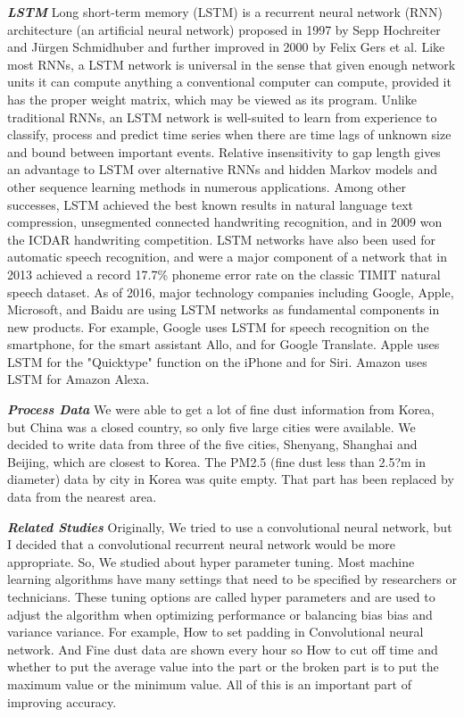 \documentclass{kcc}
\begin{document}
\textbf{\textit{LSTM}}
Long short-term memory (LSTM) is a recurrent neural network (RNN) architecture (an artificial neural network) proposed in 1997 by Sepp Hochreiter and Jürgen Schmidhuber and further improved in 2000 by Felix Gers et al. Like most RNNs, a LSTM network is universal in the sense that given enough network units it can compute anything a conventional computer can compute, provided it has the proper weight matrix, which may be viewed as its program. Unlike traditional RNNs, an LSTM network is well-suited to learn from experience to classify, process and predict time series when there are time lags of unknown size and bound between important events. Relative insensitivity to gap length gives an advantage to LSTM over alternative RNNs and hidden Markov models and other sequence learning methods in numerous applications. Among other successes, LSTM achieved the best known results in natural language text compression, unsegmented connected handwriting recognition, and in 2009 won the ICDAR handwriting competition. LSTM networks have also been used for automatic speech recognition, and were a major component of a network that in 2013 achieved a record 17.7\% phoneme error rate on the classic TIMIT natural speech dataset. As of 2016, major technology companies including Google, Apple, Microsoft, and Baidu are using LSTM networks as fundamental components in new products. For example, Google uses LSTM for speech recognition on the smartphone, for the smart assistant Allo, and for Google Translate. Apple uses LSTM for the "Quicktype" function on the iPhone and for Siri. Amazon uses LSTM for Amazon Alexa.

\textbf{\textit{Process Data}}
We were able to get a lot of fine dust information from Korea, but China was a closed country, so only five large cities were available. We decided to write data from three of the five cities, Shenyang, Shanghai and Beijing, which are closest to Korea. The PM2.5 (fine dust less than 2.5?m in diameter) data by city in Korea was quite empty. That part has been replaced by data from the nearest area.

\textbf{\textit{Related Studies}}
Originally, We tried to use a convolutional neural network, but I decided that a convolutional recurrent neural network would be more appropriate. So, We studied about hyper parameter tuning. Most machine learning algorithms have many settings that need to be specified by researchers or technicians. These tuning options are called hyper parameters and are used to adjust the algorithm when optimizing performance or balancing bias bias and variance variance. For example, How to set padding in Convolutional neural network. And Fine dust data are shown every hour so How to cut off time and whether to put the average value into the part or the broken part is to put the maximum value or the minimum value. All of this is an important part of improving accuracy. 
\end{document}
